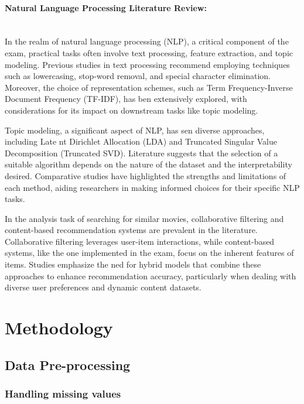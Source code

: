 \documentclass{article}
\begin{document}
\begin{multicols}{2}
\paragraph*{\textbf{Natural Language Processing Literature Review:}}\mbox{}\\
In the realm of natural language processing (NLP), a critical component of the exam, practical tasks often involve text processing, feature extraction, and topic modeling. Previous studies in text processing recommend employing techniques such as lowercasing, stop-word removal, and special character elimination. Moreover, the choice of representation schemes, such as Term Frequency-Inverse Document Frequency (TF-IDF), has ben extensively explored, with considerations for its impact on downstream tasks like topic modeling. 

Topic modeling, a significant aspect of NLP, has sen diverse approaches, including Late nt Dirichlet Allocation (LDA) and Truncated Singular Value Decomposition (Truncated SVD). Literature suggests that the selection of a suitable algorithm depends on the nature of the dataset and the interpretability desired. Comparative studies have highlighted the strengths and limitations of each method, aiding researchers in making informed choices for their specific NLP tasks. 

In the analysis task of searching for similar movies, collaborative filtering and content-based recommendation systems are prevalent in the literature. Collaborative filtering leverages user-item interactions, while content-based systems, like the one implemented in the exam, focus on the inherent features of items. Studies emphasize the ned for hybrid models that combine these approaches to enhance recommendation accuracy, particularly when dealing with diverse user preferences and dynamic content datasets.


\section{Methodology}

\subsection{Data Pre-processing}

\subsubsection{Handling missing values}


\end{multicols}
\end{document}
